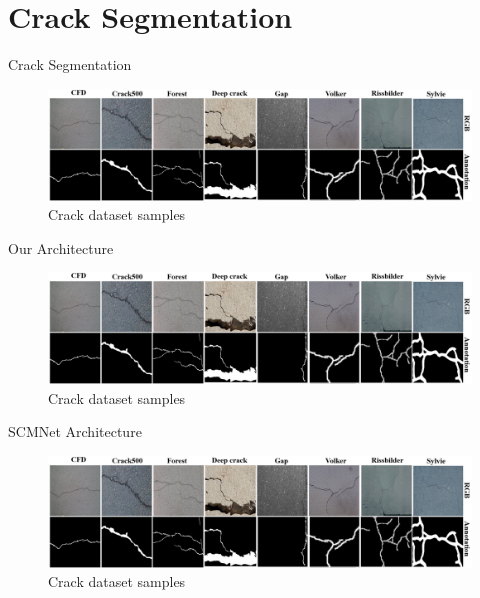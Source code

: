 \documentclass{lib/curtin_format}
\begin{document}
\section{Crack Segmentation}
\begin{frame}{Crack Segmentation}
\vspace{0.1cm}
\begin{figure}
    \centering
    \includegraphics[width=1.05\linewidth]{res/crack-dataset.png}
    \caption{Crack dataset samples}
    \label{fig:crack-dataset}
\end{figure}
\end{frame}

\begin{frame}{Our Architecture}
    \vspace{0.1cm}
    \begin{figure}
        \centering
        \includegraphics[width=1.05\linewidth]{res/crack-dataset.png}
        \caption{Crack dataset samples}
        \label{fig:crack-dataset}
    \end{figure}
    \end{frame}

\begin{frame}{SCMNet Architecture}
    \vspace{0.1cm}
    \begin{figure}
        \centering
        \includegraphics[width=1.05\linewidth]{res/crack-dataset.png}
        \caption{Crack dataset samples}
        \label{fig:crack-dataset}
    \end{figure}
    \end{frame}
\end{document}
